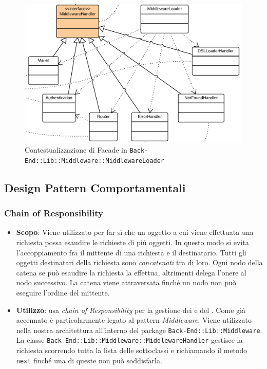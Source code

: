 \begin{figure}[H]
\centering \includegraphics[width=1\textwidth]{patterns/contestualizzazione/facade1.png}
\caption{Contestualizzazione di Facade in \texttt{Back-End::Lib::Middleware::MiddlewareLoader}}
\label{fig:mvc}
\end{figure}

\subsection{Design Pattern Comportamentali}

\subsubsection{Chain of Responsibility}
\label{chain-of-responsibility}

\begin{itemize}

	\item \textbf{Scopo}: Viene utilizzato per far sì che un oggetto a cui viene effettuata una richiesta possa esaudire le richieste di più oggetti. In questo modo si evita l'accoppiamento fra il mittente di una richiesta e il destinatario. Tutti gli oggetti destinatari della richiesta sono \textit{concatenati} tra di loro. Ogni nodo della catena se può esaudire la richiesta la effettua, altrimenti delega l'onere al nodo successivo. La catena viene attraversata finché un nodo non può eseguire l'ordine del mittente. 
	\item \textbf{Utilizzo}:  usa \textit{chain of Responsibility} per la gestione dei  e del . Come già accennato è particolarmente legato al pattern \textit{Middleware}. Viene utilizzato nella nostra architettura all'interno del package \texttt{Back-End::Lib::Middleware}. La classe \texttt{Back-End::Lib::Middleware::MiddlewareHandler} gestisce la richiesta scorrendo tutta la lista delle sottoclassi e richiamando il metodo \texttt{next} finché una di queste non può soddisfarla.

\end{itemize}

